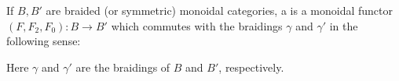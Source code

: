 If $B, B'$ are braided (or symmetric) monoidal categories, a  is a monoidal functor $(F, F_2, F_0) : B \to B'$ which commutes with the braidings $\gamma$ and $\gamma'$ in the following sense:

\begin{center}
\end{center}

Here $\gamma$ and $\gamma'$ are the braidings of $B$ and $B'$, respectively.
